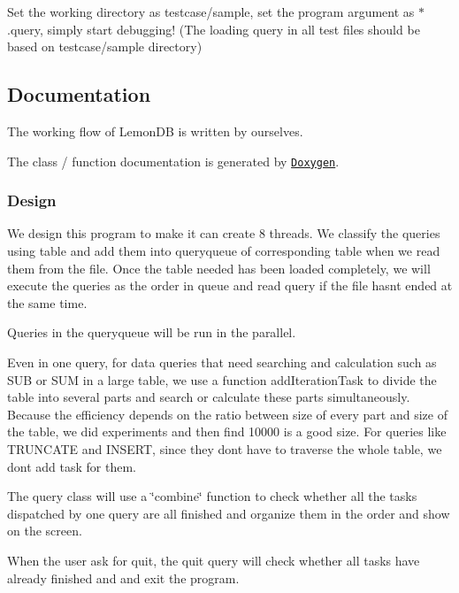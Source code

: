 Set the working directory as {\ttfamily testcase/sample}, set the program argument as {\ttfamily $\ast$.query}, simply start debugging! (The loading query in all test files should be based on {\ttfamily testcase/sample} directory)

\subsection*{Documentation}

The working flow of Lemon\+DB is written by ourselves.

The class / function documentation is generated by \href{http://www.doxygen.nl/}{\tt Doxygen}.

\subsubsection*{Design}


\begin{DoxyItemize}
\item We design this program to make it can create 8 threads. We classify the queries using table and add them into queryqueue of corresponding table when we read them from the file. Once the table needed has been loaded completely, we will execute the queries as the order in queue and read query if the file hasn\textquotesingle{}t ended at the same time.
\item Queries in the queryqueue will be run in the parallel.
\item Even in one query, for data queries that need searching and calculation such as S\+UB or S\+UM in a large table, we use a function add\+Iteration\+Task to divide the table into several parts and search or calculate these parts simultaneously. Because the efficiency depends on the ratio between size of every part and size of the table, we did experiments and then find 10000 is a good size. For queries like T\+R\+U\+N\+C\+A\+TE and I\+N\+S\+E\+RT, since they don\textquotesingle{}t have to traverse the whole table, we don\textquotesingle{}t add task for them.
\item The query class will use a \char`\"{}combine\char`\"{} function to check whether all the tasks dispatched by one query are all finished and organize them in the order and show on the screen.
\item When the user ask for quit, the quit query will check whether all tasks have already finished and and exit the program.
\end{DoxyItemize}

